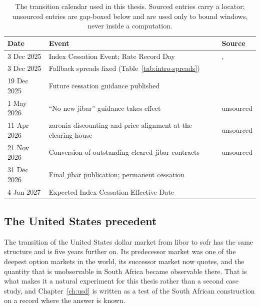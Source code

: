 \documentclass[../../../main.tex]{subfiles}
\begin{document}
\begin{table}[htbp]\centering\small
\caption{The transition calendar used in this thesis. Sourced entries carry a locator; unsourced entries are gap-boxed below and are used only to bound windows, never inside a computation.}\label{tab:intro-calendar}
\begin{tabular}{@{}lll@{}}
\toprule
Date & Event & Source \\
\midrule
3 Dec 2025 & Index Cessation Event; Rate Record Day & \citep[\S1.1]{isda2025}, \citep[p.~1]{bisl2025} \\
3 Dec 2025 & Fallback spreads fixed (Table~\ref{tab:intro-spreads}) & \citep[p.~1, Table]{bisl2025} \\
19 Dec 2025 & Future cessation guidance published & \citep{isda2025} \\
1 May 2026 & ``No new \gls{jibar}'' guidance takes effect & unsourced \\
11 Apr 2026 & \gls{zaronia} discounting and price alignment at the clearing house & unsourced \\
21 Nov 2026 & Conversion of outstanding cleared \gls{jibar} contracts & unsourced \\
31 Dec 2026 & Final \gls{jibar} publication; permanent cessation & \citep[p.~1]{isda2025} \\
4 Jan 2027 & Expected Index Cessation Effective Date & \citep[\S1.1]{isda2025} \\
\bottomrule
\end{tabular}
\end{table}


\subsection{The United States precedent}

The transition of the United States dollar market from \gls{libor} to \gls{sofr} has the same structure and is five years further on. Its predecessor market was one of the deepest option markets in the world, its successor market now quotes, and the quantity that is unobservable in South Africa became observable there. That is what makes it a natural experiment for this thesis rather than a second case study, and Chapter~\ref{ch:usd} is written as a test of the South African construction on a record where the answer is known.
\end{document}
